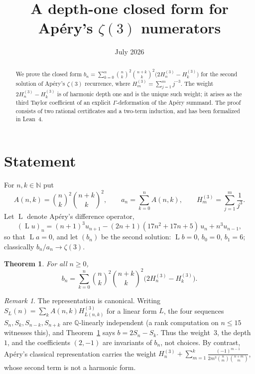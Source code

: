 \documentclass[11pt]{article}
\title{A depth-one closed form for Ap\'ery's $\zeta(3)$ numerators}
\author{}
\date{July 2026}
\newtheorem{theorem}{Theorem}
\theoremstyle{remark}
\newtheorem{remark}{Remark}
\newcommand{\QQ}{\mathbb{Q}}
\newcommand{\NN}{\mathbb{N}}
\DeclareMathOperator{\Lop}{L}
\begin{document}
\maketitle

\begin{abstract}
We prove the closed form
$b_n=\sum_{k=0}^n\binom{n}{k}^2\binom{n+k}{k}^2\bigl(2H^{(3)}_n-H^{(3)}_k\bigr)$
for the second solution of Ap\'ery's $\zeta(3)$ recurrence, where
$H^{(3)}_m=\sum_{j=1}^m j^{-3}$. The weight $2H^{(3)}_n-H^{(3)}_k$ is of
harmonic depth one and is the unique such weight; it arises as the third
Taylor coefficient of an explicit $\Gamma$-deformation of the Ap\'ery summand.
The proof consists of two rational certificates and a two-term induction, and
has been formalized in Lean~4.
\end{abstract}

\section{Statement}

For $n,k\in\NN$ put
\[
A(n,k)=\binom{n}{k}^{2}\binom{n+k}{k}^{2},\qquad
a_n=\sum_{k=0}^{n}A(n,k),\qquad
H^{(3)}_m=\sum_{j=1}^{m}\frac{1}{j^{3}} .
\]
Let $\Lop$ denote Ap\'ery's difference operator,
\[
(\Lop u)_n=(n+1)^{3}u_{n+1}-(2n+1)(17n^{2}+17n+5)\,u_n+n^{3}u_{n-1},
\]
so that $\Lop a=0$, and let $(b_n)$ be the second solution:
$\Lop b=0$, $b_0=0$, $b_1=6$; classically $b_n/a_n\to\zeta(3)$.

\begin{theorem}\label{thm:main}
For all $n\ge 0$,
\[
b_n=\sum_{k=0}^{n}\binom{n}{k}^{2}\binom{n+k}{k}^{2}
\bigl(2H^{(3)}_{n}-H^{(3)}_{k}\bigr).
\]
\end{theorem}

\begin{remark}\label{rem:unique}
The representation is canonical. Writing
$S_{L}(n)=\sum_k A(n,k)H^{(3)}_{L(n,k)}$ for a linear form $L$, the four
sequences $S_n,S_k,S_{n-k},S_{n+k}$ are $\QQ$-linearly independent (a rank
computation on $n\le 15$ witnesses this), and Theorem~\ref{thm:main} says
$b=2S_n-S_k$. Thus the weight~$3$, the depth~$1$, and the coefficients
$(2,-1)$ are invariants of $b_n$, not choices. By contrast, Ap\'ery's
classical representation carries the weight
$H^{(3)}_n+\sum_{m=1}^{k}\frac{(-1)^{m-1}}{2m^{3}\binom{n}{m}\binom{n+m}{m}}$,
whose second term is not a harmonic form.
\end{remark}
\end{document}
